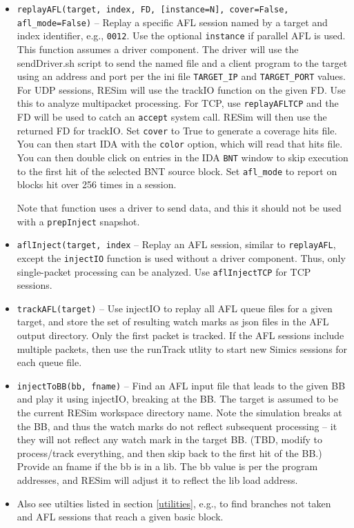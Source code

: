 \documentclass[titlepage]{article}
\begin{document}
\begin{itemize}
\item{\tt replayAFL(target, index, FD, [instance=N], cover=False, afl\_mode=False)} -- Replay a specific AFL session named by a target and index identifier, e.g., {\tt 0012}.  Use the optional {\tt instance} if parallel AFL is used.  This function assumes a driver component. The driver will use the sendDriver.sh script to send the named file and
a client program to the target using an address and port per the ini file {\tt TARGET\_IP} and {\tt TARGET\_PORT} values.  For UDP sessions, RESim will use the trackIO function on the given FD.  Use this to analyze multipacket processing.  For TCP, use {\tt replayAFLTCP} and the FD will be used to catch an {\tt accept} system call.  RESim will then use the returned FD for trackIO.  Set {\tt cover} to True to generate a coverage hits file.  You can then start IDA with the {\tt color} option, which
will read that hits file.   You can then double click on entries in the IDA {\tt BNT} window to skip execution to the first hit of the selected BNT source block.
Set {\tt afl\_mode} to report on blocks hit over 256 times in a session.

Note that function uses a driver to send data, and this it should not be used with a {\tt prepInject} snapshot.

\item{\tt aflInject(target, index} -- Replay an AFL session, similar to {\tt replayAFL}, except the {\tt injectIO} function is used without
a driver component.  Thus, only single-packet processing can be analyzed.  Use {\tt aflInjectTCP} for TCP sessions.

\item{\tt trackAFL(target)} -- Use injectIO to replay all AFL queue files for a given target, and store the set of resulting watch marks as json files
in the AFL output directory.  Only the first packet is tracked.  If the AFL sessions include multiple packets, then use the runTrack utlity to 
start new Simics sessions for each queue file.

\item{\tt injectToBB(bb, fname)} -- Find an AFL input file that leads to the given BB and play it using injectIO, breaking at the BB.  The target
is assumed to be the current RESim workspace directory name.  Note the simulation breaks at the BB, and thus the watch marks do not reflect subsequent
processing -- it they will not reflect any watch mark in the target BB. (TBD, modify to process/track everything, and then skip back to the first hit of the BB.)
Provide an fname if the bb is in a lib.  The bb value is per the program addresses, and RESim will adjust it to reflect the lib load address.

\item Also see utilties listed in section \ref{utilities}, e.g., to find branches not taken and AFL sessions that reach a given basic block.

\end{itemize}
\end{document}
